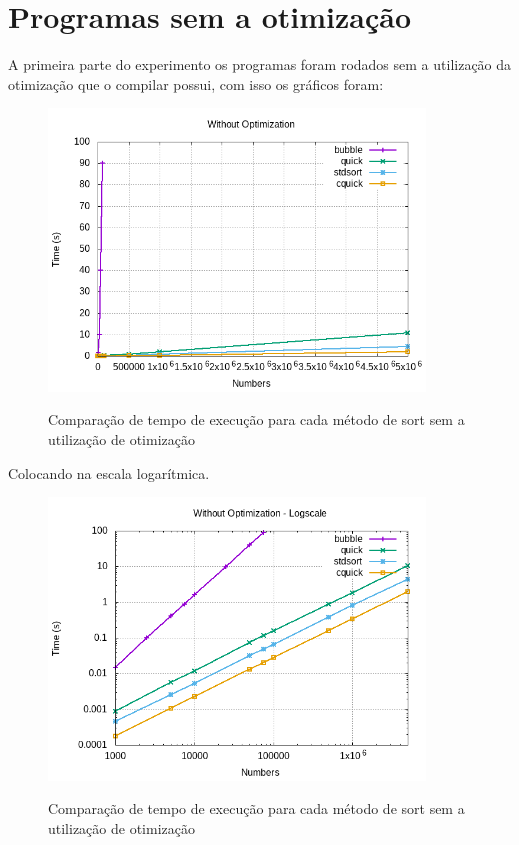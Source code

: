 \documentclass[a4paper, 12pt]{article}
\begin{document}
\justifying

\section{Programas sem a otimização}

A primeira parte do experimento os programas foram rodados sem a utilização da otimização que o compilar possui, com isso os gráficos foram: 


\begin{figure}[H]
\centering
\includegraphics[width=10.0cm]{withoutOptimization.png}
\caption{}{Comparação de tempo de execução para cada método de sort sem a utilização de otimização}  
\end{figure}

\hspace{1.5cm}

Colocando na escala logarítmica.
 
\begin{figure}[H]
\centering
\includegraphics[width=10.0cm]{withoutOptimization_log.png}
\caption{}{Comparação de tempo de execução para cada método de sort sem a utilização de otimização}
\label{fig:without_otimization}  
\end{figure}
\end{document}
